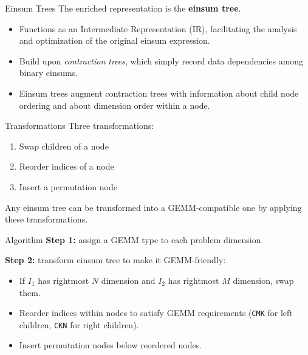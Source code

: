 \documentclass[aspectratio=169,10pt]{beamer}
\newcommand{\code}[1]{{\texttt{\colorbox{CodeBg}{#1}}}}
\begin{document}
\begin{frame}{Einsum Trees}
The enriched representation is the \textbf{einsum tree}.
\begin{itemize}
 	\item Functions as an Intermediate Representation (IR), facilitating the analysis and optimization of the original einsum expression.
	\item Build upon \emph{contraction trees}, which simply record data dependencies among binary einsums.
	\item Einsum trees augment contraction trees with information about child node ordering and about dimension order within a node.
\end{itemize}
\end{frame}

\begin{frame}{Transformations}
	Three transformations:
	\begin{enumerate}
		\item Swap children of a node
		\item Reorder indices of a node
		\item Insert a permutation node
	\end{enumerate}
	Any einsum tree can be transformed into a GEMM-compatible one by applying these transformations.
\end{frame}

\begin{frame}{Algorithm}
	\textbf{Step 1:} assign a GEMM type to each problem dimension

	\textbf{Step 2:} transform einsum tree to make it GEMM-friendly:
	\begin{itemize}
		\item If $I_1$ has rightmost $N$ dimension and $I_2$ has rightmost $M$ dimension, swap them.
		\item Reorder indices within nodes to satisfy GEMM requirements (\code{CMK} for left children, \code{CKN} for right children).
		\item Insert permutation nodes below reordered nodes.
	\end{itemize}
\end{frame}
\end{document}
